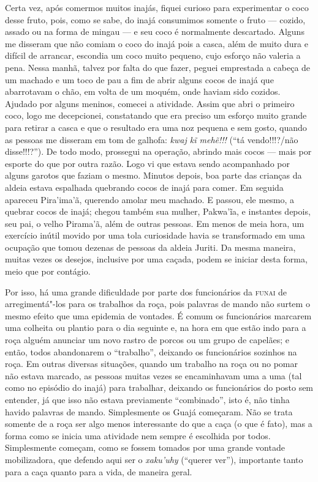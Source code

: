 Certa vez, após comermos muitos inajás, fiquei curioso para experimentar
o coco desse fruto, pois, como se sabe, do inajá consumimos somente o
fruto --- cozido, assado ou na forma de mingau --- e seu coco é normalmente
descartado. Alguns me disseram que não comiam o coco do inajá pois a
casca, além de muito dura e difícil de arrancar, escondia um coco muito
pequeno, cujo esforço não valeria a pena. Nessa manhã, talvez por falta
do que fazer, peguei emprestada a cabeça de um machado e um toco de pau
a fim de abrir alguns cocos de inajá que abarrotavam o chão, em volta de
um moquém, onde haviam sido cozidos. Ajudado por alguns meninos, comecei
a atividade. Assim que abri o primeiro coco, logo me decepcionei,
constatando que era preciso um esforço muito grande para retirar a casca
e que o resultado era uma noz pequena e sem gosto, quando as pessoas me
disseram em tom de galhofa: \emph{kwaj kĩ mehẽ!!!} (``tá vendo!!!?/não
disse!!!?''). De todo modo, prossegui na operação, abrindo mais cocos ---
mais por esporte do que por outra razão. Logo vi que estava sendo
acompanhado por alguns garotos que faziam o mesmo. Minutos depois, boa
parte das crianças da aldeia estava espalhada quebrando cocos de inajá
para comer. Em seguida apareceu Pira'ima'ã, querendo amolar meu machado.
E passou, ele mesmo, a quebrar cocos de inajá; chegou também sua mulher,
Pakwa'ĩa, e instantes depois, seu pai, o velho Pirama'ã, além de outras
pessoas. Em menos de meia hora, um exercício inútil movido por uma tola
curiosidade havia se transformado em uma ocupação que tomou dezenas de
pessoas da aldeia Juriti. Da mesma maneira, muitas vezes os desejos,
inclusive por uma caçada, podem se iniciar desta forma, meio que por
contágio.

Por isso, há uma grande dificuldade por parte dos funcionários da \textsc{funai}
de arregimentá"-los para os trabalhos da roça, pois palavras de mando não
surtem o mesmo efeito que uma epidemia de vontades. É comum os
funcionários marcarem uma colheita ou plantio para o dia seguinte e, na
hora em que estão indo para a roça alguém anunciar um novo rastro de
porcos ou um grupo de capelães; e então, todos abandonarem o ``trabalho'',
deixando os funcionários sozinhos na roça. Em outras diversas situações,
quando um trabalho na roça ou no pomar não estava marcado, as pessoas
muitas vezes se encaminhavam uma a uma (tal como no episódio do inajá)
para trabalhar, deixando os funcionários do posto sem entender, já que
isso não estava previamente ``combinado'', isto é, não tinha havido
palavras de mando. Simplesmente os Guajá começaram. Não se trata somente
de a roça ser algo menos interessante do que a caça (o que é fato), mas
a forma como se inicia uma atividade nem sempre é escolhida por todos.
Simplesmente começam, como se fossem tomados por uma grande vontade
mobilizadora, que defendo aqui ser o \emph{xaku'uhy} (``querer ver''),
importante tanto para a caça quanto para a vida, de maneira geral.

